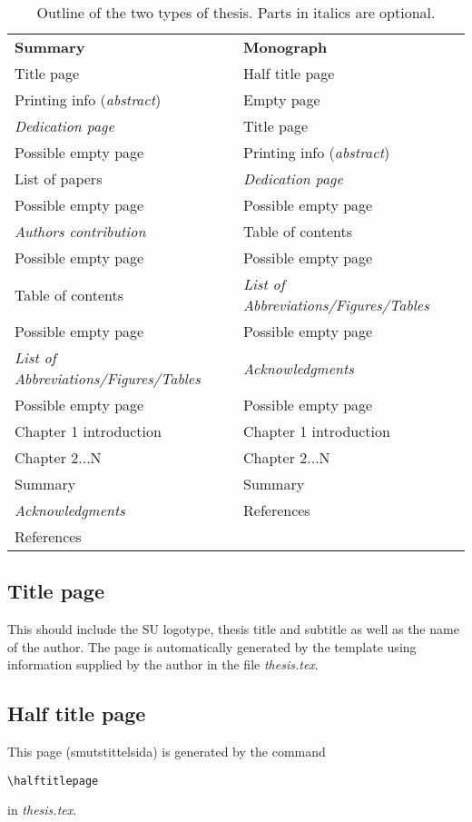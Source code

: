 \begin{table}[htdp]
\begin{tabular}{|l|l|}
\hline
\textbf{Summary} & \textbf{Monograph} \\
Title page & Half title page \\
Printing info (\emph{abstract}) & Empty page \\
\emph{Dedication page} & Title page \\
Possible empty page & Printing info (\emph{abstract}) \\
List of papers & \emph{Dedication page} \\
Possible empty page & Possible empty page \\
\emph{Authors contribution} & Table of contents \\
Possible empty page & Possible empty page \\
Table of contents & \emph{List of Abbreviations/Figures/Tables} \\
Possible empty page & Possible empty page \\
\emph{List of Abbreviations/Figures/Tables}  & \emph{Acknowledgments} \\
Possible empty page & Possible empty page \\
Chapter 1 introduction & Chapter 1 introduction\\
Chapter 2...N & Chapter 2...N\\
Summary & Summary \\
\emph{Acknowledgments} & References \\
References & \\
\hline

\end{tabular}
\caption{\label{tab:outline}Outline of the two types of thesis. Parts in italics are optional.}
\end{table}

\subsection{Title page}
This should include the SU logotype, thesis title and subtitle as well as the name of the author. The page is automatically generated by the template using information supplied by the author in the file \emph{thesis.tex}.

\subsection{Half title page}
This page (smutstittelsida) is generated by the command 
\begin{verbatim}
\halftitlepage
\end{verbatim}
in \emph{thesis.tex}.

